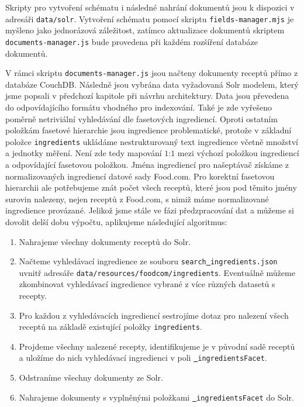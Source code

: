 Skripty pro vytvoření schématu i následné nahrání dokumentů jsou k dispozici v adresáři \texttt{data/solr}. Vytvoření schématu pomocí skriptu \texttt{fields-manager.mjs} je myšleno jako jednorázová záležitost, zatímco aktualizace dokumentů skriptem \texttt{documents-manager.js} bude provedena při každém rozšíření databáze dokumentů.

V rámci skriptu \texttt{documents-manager.js} jsou načteny dokumenty receptů přímo z databáze CouchDB. Následně jsou vybrána data vyžadovaná Solr modelem, který jsme popsali v předchozí kapitole při návrhu architektury. Data jsou převedena do odpovídajícího formátu vhodného pro indexování. Také je zde vyřešeno poměrně netriviální vyhledávání dle fasetových ingrediencí. Oproti ostatním položkám fasetové hierarchie jsou ingredience problematické, protože v základní položce \texttt{ingredients} ukládáme nestrukturovaný text ingredience včetně množství a jednotky měření. Není zde tedy mapování $1$:$1$ mezi výchozí položkou ingrediencí a odpovídající fasetovou položkou. Jména ingrediencí pro našeptávač získáme z normalizovaných ingrediencí datové sady Food.com. Pro korektní fasetovou hierarchii ale potřebujeme znát počet všech receptů, které jsou pod těmito jmény surovin nalezeny, nejen receptů z Food.com, s nimiž máme normalizované ingredience provázané. Jelikož jsme stále ve fázi předzpracování dat a můžeme si dovolit delší dobu výpočtu, aplikujeme následující algoritmus:
\begin{enumerate}
    \item Nahrajeme všechny dokumenty receptů do Solr.
    \item Načteme vyhledávací ingredience ze souboru \texttt{search\underline{{ }}ingredients.json} uvnitř adresáře \texttt{data/resources/foodcom/ingredients}. Eventuálně můžeme zkombinovat vyhledávací ingredience vybrané z více různých datasetů s recepty.
    \item Pro každou z vyhledávacích ingrediencí sestrojíme dotaz pro nalezení všech receptů na základě existující položky \texttt{ingredients}.
    \item Projdeme všechny nalezené recepty, identifikujeme je v původní sadě receptů a uložíme do nich vyhledávací ingredienci v poli \texttt{\underline{{ }}ingredientsFacet}.
    \item Odstraníme všechny dokumenty ze Solr.
    \item Nahrajeme dokumenty s vyplněnými položkami \texttt{\underline{{ }}ingredientsFacet} do Solr.
\end{enumerate}

